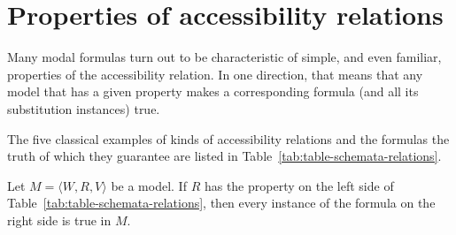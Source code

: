 \section{Properties of accessibility relations}

Many modal formulas turn out to be characteristic of simple, and
even familiar, properties of the accessibility relation. In one direction, 
that means that any model that has a given property makes a 
corresponding formula (and all its substitution instances) true. 

The five classical examples of kinds of accessibility 
relations and the formulas the truth of which they guarantee are 
listed in Table~\ref{tab:table-schemata-relations}.

\begin{theorem}
  \label{thm:truth-guarantee}
  Let $M = \langle W, R, V \rangle$ be a model. If $R$ has the property 
  on the left side of Table~\ref{tab:table-schemata-relations}, then every instance of the formula on the 
  right side is true in $M$.
\end{theorem}
